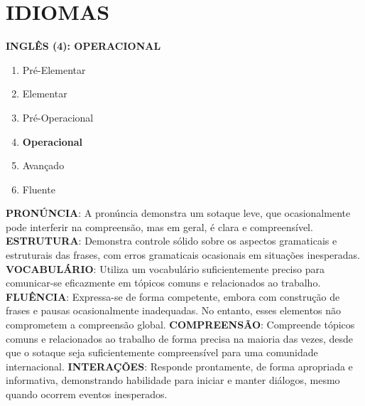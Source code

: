 \documentclass[10.5pt, a4paper]{report}
\begin{document}
\section{IDIOMAS}
\vspace{8pt}
\textbf{INGLÊS (4): OPERACIONAL}
\begin{enumerate}[leftmargin=32pt, topsep=16pt, itemsep=-2pt, align=left]
  \item Pré-Elementar
  \item Elementar
  \item Pré-Operacional
  \item \textbf{Operacional}
  \item Avançado
  \item Fluente
\end{enumerate}
\vspace{15pt}
\textbf{PRONÚNCIA}: A pronúncia demonstra um sotaque leve, que ocasionalmente pode interferir na compreensão, mas em geral, é clara e compreensível.
\newline\newline
\textbf{ESTRUTURA}:  Demonstra controle sólido sobre os aspectos gramaticais e estruturais das frases, com erros gramaticais ocasionais em situações inesperadas.
\newline\newline
\textbf{VOCABULÁRIO}:  Utiliza um vocabulário suficientemente preciso para comunicar-se eficazmente em tópicos comuns e relacionados ao trabalho.
\newline\newline
\textbf{FLUÊNCIA}:  Expressa-se de forma competente, embora com construção de frases e pausas ocasionalmente inadequadas. No entanto, esses elementos não comprometem a compreensão global.
\newline\newline
\textbf{COMPREENSÃO}:  Compreende tópicos comuns e relacionados ao trabalho de forma precisa na maioria das vezes, desde que o sotaque seja suficientemente compreensível para uma comunidade internacional.
\newline\newline
\textbf{INTERAÇÕES}:  Responde prontamente, de forma apropriada e informativa, demonstrando habilidade para iniciar e manter diálogos, mesmo quando ocorrem eventos inesperados.
\vspace{25pt}
\newline\newline
\end{document}
